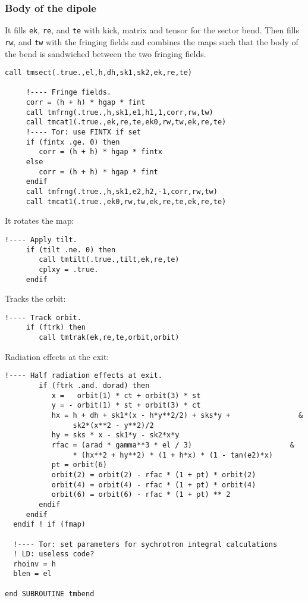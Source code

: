 \documentclass{cern-art} %
\renewcommand{\L}[1]{\lstinline[firstnumber=last]{#1}}
\begin{document}
\subsubsection{Body of the dipole}
  It fills  \L{ek},  \L{re}, and \L{te} with kick, matrix and tensor for the sector bend. Then fills  \L{rw}, and \L{tw} with the fringing fields and combines the maps such that the body of the bend is sandwiched between the two fringing fields.    \begin{lstlisting}[firstnumber=last]
     call tmsect(.true.,el,h,dh,sk1,sk2,ek,re,te)

     !---- Fringe fields.
     corr = (h + h) * hgap * fint
     call tmfrng(.true.,h,sk1,e1,h1,1,corr,rw,tw)
     call tmcat1(.true.,ek,re,te,ek0,rw,tw,ek,re,te)
     !---- Tor: use FINTX if set
     if (fintx .ge. 0) then
        corr = (h + h) * hgap * fintx
     else
        corr = (h + h) * hgap * fint
     endif
     call tmfrng(.true.,h,sk1,e2,h2,-1,corr,rw,tw)
     call tmcat1(.true.,ek0,rw,tw,ek,re,te,ek,re,te)
\end{lstlisting}
It rotates the map:
\begin{lstlisting}[firstnumber=last]
     !---- Apply tilt.
     if (tilt .ne. 0) then
        call tmtilt(.true.,tilt,ek,re,te)
        cplxy = .true.
     endif
\end{lstlisting}
Tracks the orbit:
\begin{lstlisting}[firstnumber=last]
     !---- Track orbit.
     if (ftrk) then
        call tmtrak(ek,re,te,orbit,orbit)
\end{lstlisting}
Radiation effects at the exit:
\begin{lstlisting}[firstnumber=last]
        !---- Half radiation effects at exit.
        if (ftrk .and. dorad) then
           x =   orbit(1) * ct + orbit(3) * st
           y = - orbit(1) * st + orbit(3) * ct
           hx = h + dh + sk1*(x - h*y**2/2) + sks*y +                &
                sk2*(x**2 - y**2)/2
           hy = sks * x - sk1*y - sk2*x*y
           rfac = (arad * gamma**3 * el / 3)                       &
                * (hx**2 + hy**2) * (1 + h*x) * (1 - tan(e2)*x)
           pt = orbit(6)
           orbit(2) = orbit(2) - rfac * (1 + pt) * orbit(2)
           orbit(4) = orbit(4) - rfac * (1 + pt) * orbit(4)
           orbit(6) = orbit(6) - rfac * (1 + pt) ** 2
        endif
     endif
  endif ! if (fmap)

  !---- Tor: set parameters for sychrotron integral calculations
  ! LD: useless code?
  rhoinv = h
  blen = el

end SUBROUTINE tmbend
\end{lstlisting}
\end{document}
